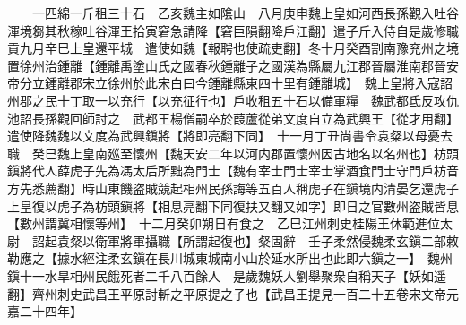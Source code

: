 　　一匹綿一斤租三十石　乙亥魏主如隂山　八月庚申魏上皇如河西長孫觀入吐谷渾境芻其秋稼吐谷渾王拾寅窘急請降【窘巨隕翻降戶江翻】遣子斤入侍自是歲修職貢九月辛巳上皇還平城　遣使如魏【報聘也使疏吏翻】冬十月癸酉割南豫兖州之境置徐州治鍾離【鍾離禹塗山氏之國春秋鍾離子之國漢為縣屬九江郡晉屬淮南郡晉安帝分立鍾離郡宋立徐州於此宋白曰今鍾離縣東四十里有鍾離城】　魏上皇將入寇詔州郡之民十丁取一以充行【以充征行也】戶收租五十石以備軍糧　魏武都氐反攻仇池詔長孫觀回師討之　武都王楊僧嗣卒於葭蘆從弟文度自立為武興王【從才用翻】遣使降魏魏以文度為武興鎭將【將即亮翻下同】　十一月丁丑尚書令袁粲以母憂去職　癸巳魏上皇南廵至懷州【魏天安二年以河内郡置懷州因古地名以名州也】枋頭鎭將代人薛虎子先為馮太后所黜為門士【魏有宰士門士宰士掌酒食門士守門戶枋音方先悉薦翻】時山東饑盗賊競起相州民孫誨等五百人稱虎子在鎭境内清晏乞還虎子上皇復以虎子為枋頭鎭將【相息亮翻下同復扶又翻又如字】即日之官數州盗賊皆息【數州謂冀相懷等州】　十二月癸卯朔日有食之　乙巳江州刺史桂陽王休範進位太尉　詔起袁粲以衛軍將軍攝職【所謂起復也】粲固辭　壬子柔然侵魏柔玄鎭二部敕勒應之【據水經注柔玄鎭在長川城東城南小山於延水所出也此即六鎭之一】　魏州鎭十一水旱相州民餓死者二千八百餘人　是歲魏妖人劉舉聚衆自稱天子【妖如遥翻】齊州刺史武昌王平原討斬之平原提之子也【武昌王提見一百二十五卷宋文帝元嘉二十四年】


